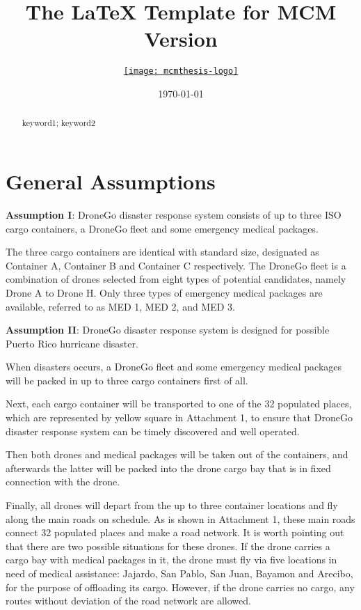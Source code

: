\documentclass{mcmthesis}
\title{The \LaTeX{} Template for MCM Version \MCMversion}
\author{\small \href{http://www.latexstudio.net/}
  {\texttt{[image: mcmthesis-logo]}}}
\date{\today}
\begin{document}
\begin{abstract}
\lipsum[1]
\begin{keywords}
keyword1; keyword2
\end{keywords}
\end{abstract}
\maketitle
\tableofcontents
\newpage

\section{General Assumptions}
\textbf{Assumption I}: DroneGo disaster response system consists of up to three ISO cargo containers, a DroneGo fleet and some emergency medical packages. 

\noindent The three cargo containers are identical with standard size, designated as Container A, Container B and Container C respectively. The DroneGo fleet is a combination of drones selected from eight types of potential candidates, namely Drone A to Drone H. Only three types of emergency medical packages are available, referred to as MED 1, MED 2, and MED 3.

\noindent\textbf{Assumption II}: DroneGo disaster response system is designed for possible Puerto Rico hurricane disaster. 

\noindent When disasters occurs, a DroneGo fleet and some emergency medical packages will be packed in up to three cargo containers first of all. 

\noindent Next, each cargo container will be transported to one of the 32 populated places, which are represented by yellow square in Attachment 1, to ensure that DroneGo disaster response system can be timely discovered and well operated. 

\noindent Then both drones and medical packages will be taken out of the containers, and afterwards the latter will be packed into the drone cargo bay that is in fixed connection with the drone. 

\noindent Finally, all drones will depart from the up to three container locations and fly along the main roads on schedule. As is shown in Attachment 1, these main roads connect 32 populated places and make a road network. It is worth pointing out that there are two possible situations for these drones. If the drone carries a cargo bay with medical packages in it, the drone must fly via five locations in need of medical assistance: Jajardo, San Pablo, San Juan, Bayamon and Arecibo, for the purpose of offloading its cargo. However, if the drone carries no cargo, any routes without deviation of the road network are allowed.
\end{document}
